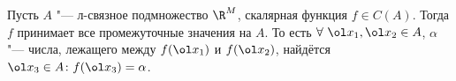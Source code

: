 
	 Пусть $A$ "--- л-связное подмножество $\R^M$, скалярная функция $f\in C(A)$. Тогда $f$ принимает все промежуточные значения на $A$.
	 То есть $\forall\ \ol x_1,\ol x_2\in A$, $\alpha$ "--- числа, лежащего между $f(\ol x_1)$ и $f(\ol x_2)$,
	 найдётся $\ol x_3\in A\colon f(\ol x_3) = \alpha$.
	 